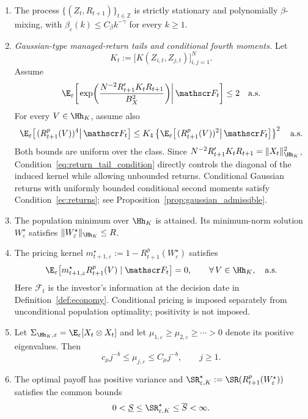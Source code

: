 \begin{enumerate}[label=\textup{(E\arabic*)},leftmargin=*,itemsep=0.4em]

\item\label{ec:dependence}
The process $\{(Z_t,R_{t+1})\}_{t\in\mathbb Z}$ is strictly stationary and
polynomially $\beta$-mixing, with
$\beta_\varepsilon(k)\leq C_\beta k^{-\gamma}$ for every $k\geq1$.

\item\label{ec:returns}
\textit{Gaussian-type managed-return tails and conditional fourth moments.}
Let
\[
K_t:=\bigl[K(Z_{i,t},Z_{j,t})\bigr]_{i,j=1}^N.
\]
Assume
\begin{equation}
\E_\varepsilon\!\left[
\left.
\exp\!\left(
\frac{N^{-2}R_{t+1}'K_tR_{t+1}}{B_X^2}
\right)
\right|\mathscr F_t
\right]\leq2
\quad\text{a.s.}
\label{eq:return_tail_condition}
\end{equation}
For every $V\in\Hh_K$, assume also
\begin{equation}
\E_\varepsilon\!\left[
\left.(R^p_{t+1}(V))^4\right|\mathscr F_t
\right]
\leq
K_4
\left\{
\E_\varepsilon\!\left[
\left.(R^p_{t+1}(V))^2\right|\mathscr F_t
\right]
\right\}^2
\quad\text{a.s.}
\label{eq:conditional_fourth_condition}
\end{equation}
Both bounds are uniform over the class. Since
$N^{-2}R_{t+1}'K_tR_{t+1}=\|X_t\|_{\Hh_K}^2$,
Condition~\eqref{eq:return_tail_condition} directly controls the diagonal
of the induced kernel while allowing unbounded returns. Conditional Gaussian
returns with uniformly bounded conditional second moments satisfy
Condition~\ref{ec:returns}; see Proposition~\ref{prop:gaussian_admissible}.

\item\label{ec:target}
The population minimum over $\Hh_K$ is attained. Its minimum-norm solution
$W^\star_\varepsilon$ satisfies $\|W^\star_\varepsilon\|_{\Hh_K}\leq R$.

\item\label{ec:pricing}
The pricing kernel $m^\star_{t+1,\varepsilon}
:=1-R^p_{t+1}(W^\star_\varepsilon)$ satisfies
\[
\E_\varepsilon\!\left[
 m^\star_{t+1,\varepsilon}R^p_{t+1}(V)
 \mid\mathscr F_t
\right]=0,
\qquad \forall\,V\in\Hh_K,
\quad\text{a.s.}
\]
Here $\mathscr F_t$ is the investor's information at the decision date in
Definition~\ref{def:economy}. Conditional pricing is imposed separately from
unconditional population optimality; positivity is not imposed.

\item\label{ec:spectrum}
Let $\Sigma_{\Hh_K,\varepsilon}=\E_\varepsilon[X_t\otimes X_t]$ and let
$\mu_{1,\varepsilon}\geq\mu_{2,\varepsilon}\geq\cdots>0$ denote its positive
eigenvalues. Then
\[
c_\mu j^{-b}\leq\mu_{j,\varepsilon}\leq C_\mu j^{-b},
\qquad j\geq1.
\]

\item\label{ec:sharpe}
The optimal payoff has positive
variance and $\SR^\star_{\varepsilon,K}:=\SR(R^p_{t+1}(W^\star_\varepsilon))$
satisfies the common bounds
\[
0<\underline S\leq\SR^\star_{\varepsilon,K}\leq\overline S<\infty.
\]
\end{enumerate}


